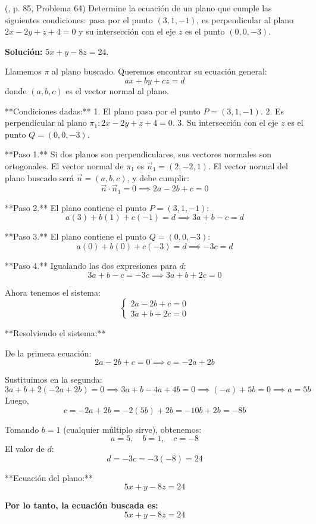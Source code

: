 \begin{prob} (\cite{espinoza2006Algebralineal}, p. 85, Problema 64) Determine la ecuación de un plano que cumple las siguientes condiciones: pasa por el punto $(3,1,-1)$, es perpendicular al plano $2x-2y+z+4=0$ y su intersección con el eje $z$ es el punto $(0,0,-3)$. 

\textbf{Solución:} $5x+y-8z=24$.

\begin{myproof}
Llamemos $\pi$ al plano buscado. Queremos encontrar su ecuación general:
\[
ax + by + cz = d
\]
donde $(a,b,c)$ es el vector normal al plano.

**Condiciones dadas:**
1. El plano pasa por el punto $P = (3,1,-1)$.
2. Es perpendicular al plano $\pi_1: 2x-2y+z+4=0$.
3. Su intersección con el eje $z$ es el punto $Q = (0,0,-3)$.

**Paso 1.**  
Si dos planos son perpendiculares, sus vectores normales son ortogonales.  
El vector normal de $\pi_1$ es $\vec{n}_1 = (2,-2,1)$.  
El vector normal del plano buscado será $\vec{n} = (a,b,c)$, y debe cumplir:
\[
\vec{n} \cdot \vec{n}_1 = 0 \implies 2a - 2b + c = 0
\]

**Paso 2.**  
El plano contiene el punto $P = (3,1,-1)$:
\[
a(3) + b(1) + c(-1) = d
\implies 3a + b - c = d
\]

**Paso 3.**  
El plano contiene el punto $Q = (0,0,-3)$:
\[
a(0) + b(0) + c(-3) = d
\implies -3c = d
\]

**Paso 4.**  
Igualando las dos expresiones para $d$:
\[
3a + b - c = -3c \implies 3a + b + 2c = 0
\]

Ahora tenemos el sistema:
\[
\begin{cases}
2a - 2b + c = 0 \\
3a + b + 2c = 0
\end{cases}
\]

**Resolviendo el sistema:**

De la primera ecuación:
\[
2a - 2b + c = 0 \implies c = -2a + 2b
\]

Sustituimos en la segunda:
\[
3a + b + 2(-2a + 2b) = 0 \implies 3a + b -4a + 4b = 0 \implies
(-a) + 5b = 0 \implies a = 5b
\]
Luego,
\[
c = -2a + 2b = -2(5b) + 2b = -10b + 2b = -8b
\]

Tomando $b = 1$ (cualquier múltiplo sirve), obtenemos:
\[
a = 5,\quad b = 1,\quad c = -8
\]
El valor de $d$:
\[
d = -3c = -3(-8) = 24
\]

**Ecuación del plano:**
\[
5x + y - 8z = 24
\]

\textbf{Por lo tanto, la ecuación buscada es:}
\[
\boxed{5x + y - 8z = 24}
\]
\end{myproof}

\end{prob}

